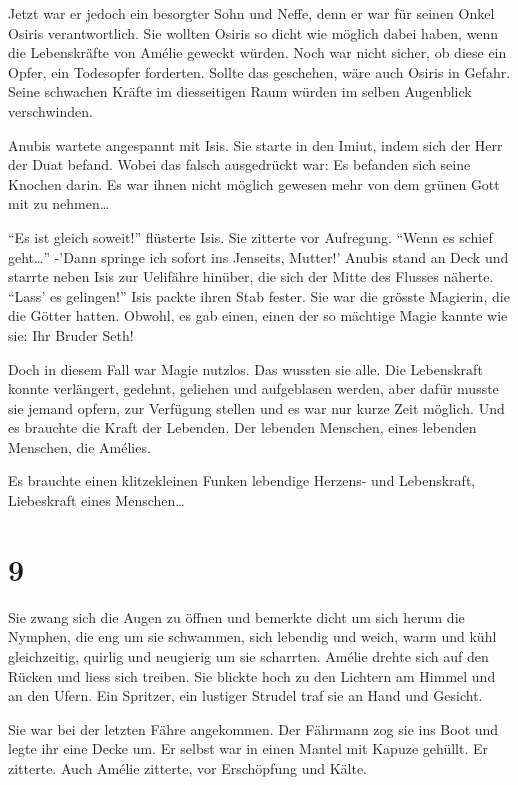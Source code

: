 \documentclass[11pt,titlepage,a5paper]{book}
\begin{document}
Jetzt war er jedoch ein besorgter Sohn und Neffe, denn er war für seinen Onkel Osiris verantwortlich. Sie wollten Osiris so dicht wie möglich dabei haben, wenn die Lebenskräfte von Amélie geweckt würden. Noch war nicht sicher, ob diese ein Opfer, ein Todesopfer forderten. Sollte das geschehen, wäre auch Osiris in Gefahr. Seine schwachen Kräfte im diesseitigen Raum würden im selben Augenblick verschwinden.

Anubis wartete angespannt mit Isis. Sie starte in den Imiut, indem sich der Herr der Duat befand. Wobei das falsch ausgedrückt war: Es befanden sich seine Knochen darin. Es war ihnen nicht möglich gewesen mehr von dem grünen Gott mit zu nehmen\dots

"`Es ist gleich soweit!"' flüsterte Isis. Sie zitterte vor Aufregung. "`Wenn es schief geht\dots"' -'Dann springe ich sofort ins Jenseits, Mutter!' Anubis stand an Deck und starrte neben Isis zur Uelifähre hinüber, die sich der Mitte des Flusses näherte. "`Lass' es gelingen!"' Isis packte ihren Stab fester. Sie war die grösste Magierin, die die Götter hatten. Obwohl, es gab einen, einen der so mächtige Magie kannte wie sie: Ihr Bruder Seth!

Doch in diesem Fall war Magie nutzlos. Das wussten sie alle. Die Lebenskraft konnte verlängert, gedehnt, geliehen und aufgeblasen werden, aber dafür musste sie jemand opfern, zur Verfügung stellen und es war nur kurze Zeit möglich. Und es brauchte die Kraft der Lebenden. Der lebenden Menschen, eines lebenden Menschen, die Amélies.

Es brauchte einen klitzekleinen Funken lebendige Herzens- und Lebenskraft, Liebeskraft eines Menschen\dots

\section*{9}

Sie zwang sich die Augen zu öffnen und bemerkte dicht um sich herum die Nymphen, die eng um sie schwammen, sich lebendig und weich, warm und kühl gleichzeitig, quirlig und neugierig um sie scharrten. Amélie drehte sich auf den Rücken und liess sich treiben. Sie blickte hoch zu den Lichtern am Himmel und an den Ufern. Ein Spritzer, ein lustiger Strudel traf sie an Hand und Gesicht.

Sie war bei der letzten Fähre angekommen. Der Fährmann zog sie ins Boot und legte ihr eine Decke um. Er selbst war in einen Mantel mit Kapuze gehüllt. Er zitterte. Auch Amélie zitterte, vor Erschöpfung und Kälte.
\end{document}

